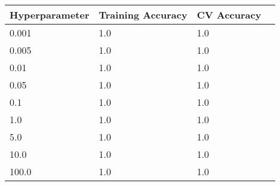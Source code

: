 \def\arraystretch{1.25}
\begin{center}
{\small
\begin{tabular}{l l l c}
\hline
\hline
\textbf{Hyperparameter}&\textbf{Training Accuracy} & \textbf{CV Accuracy}\\
\hline
\hline
0.001&1.0&1.0\\
0.005&1.0&1.0\\
0.01&1.0&1.0\\
0.05&1.0&1.0\\
0.1&1.0&1.0\\
1.0&1.0&1.0\\
5.0&1.0&1.0\\
10.0&1.0&1.0\\
100.0&1.0&1.0\\
\hline
\end{tabular}

}
\end{center}